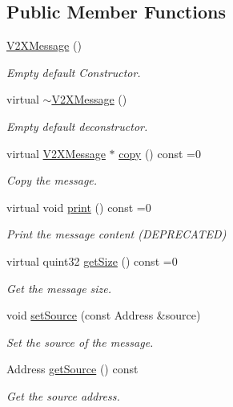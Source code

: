 \subsection*{Public Member Functions}
\begin{DoxyCompactItemize}
\item 
\hyperlink{classV2XMessage_a4000543fbe0ed18d5a55864a7eb80b7d}{V2\+X\+Message} ()\hypertarget{classV2XMessage_a4000543fbe0ed18d5a55864a7eb80b7d}{}\label{classV2XMessage_a4000543fbe0ed18d5a55864a7eb80b7d}

\begin{DoxyCompactList}\small\item\em Empty default Constructor. \end{DoxyCompactList}\item 
virtual \hyperlink{classV2XMessage_afc5697ed69362a6cb53af027f7d9311e}{$\sim$\+V2\+X\+Message} ()\hypertarget{classV2XMessage_afc5697ed69362a6cb53af027f7d9311e}{}\label{classV2XMessage_afc5697ed69362a6cb53af027f7d9311e}

\begin{DoxyCompactList}\small\item\em Empty default deconstructor. \end{DoxyCompactList}\item 
virtual \hyperlink{classV2XMessage}{V2\+X\+Message} $\ast$ \hyperlink{classV2XMessage_a0838dc7505794641df7f0a3bdc4148b1}{copy} () const =0
\begin{DoxyCompactList}\small\item\em Copy the message. \end{DoxyCompactList}\item 
virtual void \hyperlink{classV2XMessage_a233239ca7e33f6db8c4fc4176ecc2c69}{print} () const =0\hypertarget{classV2XMessage_a233239ca7e33f6db8c4fc4176ecc2c69}{}\label{classV2XMessage_a233239ca7e33f6db8c4fc4176ecc2c69}

\begin{DoxyCompactList}\small\item\em Print the message content (D\+E\+P\+R\+E\+C\+A\+T\+ED) \end{DoxyCompactList}\item 
virtual quint32 \hyperlink{classV2XMessage_ae1b54af9f8f88bb0c2a6967d3f6e7777}{get\+Size} () const =0
\begin{DoxyCompactList}\small\item\em Get the message size. \end{DoxyCompactList}\item 
void \hyperlink{classV2XMessage_a46e7b3abf9f2fdf2a7a94935c41e97d2}{set\+Source} (const Address \&source)
\begin{DoxyCompactList}\small\item\em Set the source of the message. \end{DoxyCompactList}\item 
Address \hyperlink{classV2XMessage_a86d4f9af9ea21c0c30bc06b1a3615ca0}{get\+Source} () const 
\begin{DoxyCompactList}\small\item\em Get the source address. \end{DoxyCompactList}\end{DoxyCompactItemize}


